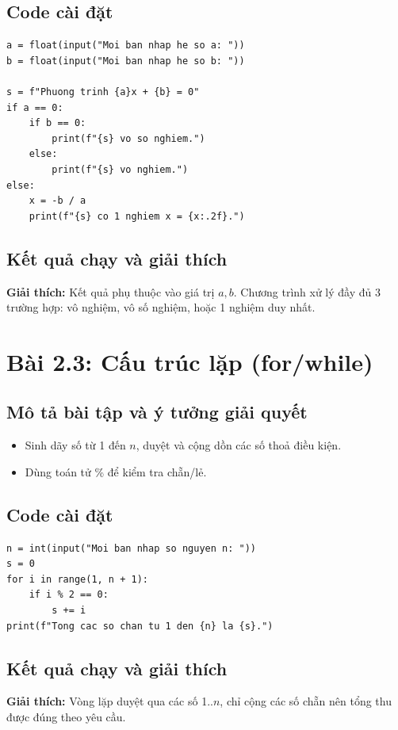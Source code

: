 \subsection{Code cài đặt}
\begin{lstlisting}
a = float(input("Moi ban nhap he so a: "))
b = float(input("Moi ban nhap he so b: "))

s = f"Phuong trinh {a}x + {b} = 0"
if a == 0:
    if b == 0:
        print(f"{s} vo so nghiem.")
    else:
        print(f"{s} vo nghiem.")
else:
    x = -b / a
    print(f"{s} co 1 nghiem x = {x:.2f}.")
\end{lstlisting}

\subsection{Kết quả chạy và giải thích}

\textbf{Giải thích:} Kết quả phụ thuộc vào giá trị \(a, b\). Chương trình xử lý đầy đủ 3 trường hợp: vô nghiệm, vô số nghiệm, hoặc 1 nghiệm duy nhất.

\section{Bài 2.3: Cấu trúc lặp (for/while)}
\subsection{Mô tả bài tập và ý tưởng giải quyết}
\begin{itemize}
  \item Sinh dãy số từ 1 đến \(n\), duyệt và cộng dồn các số thoả điều kiện.
  \item Dùng toán tử \% để kiểm tra chẵn/lẻ.
\end{itemize}

\subsection{Code cài đặt}
\begin{lstlisting}
n = int(input("Moi ban nhap so nguyen n: "))
s = 0
for i in range(1, n + 1):
    if i % 2 == 0:
        s += i
print(f"Tong cac so chan tu 1 den {n} la {s}.")
\end{lstlisting}

\subsection{Kết quả chạy và giải thích}

\textbf{Giải thích:} Vòng lặp duyệt qua các số 1..\(n\), chỉ cộng các số chẵn nên tổng thu được đúng theo yêu cầu.

\clearpage

